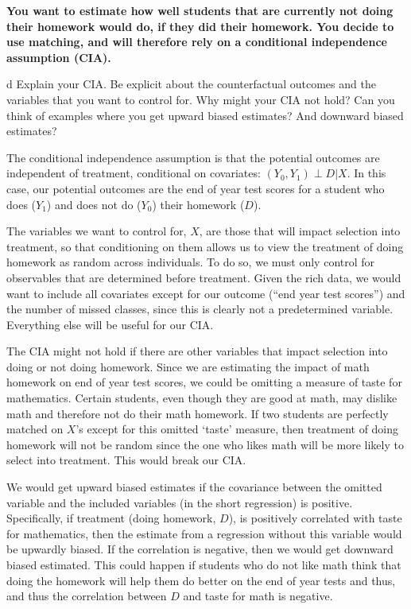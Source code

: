\documentclass{article}
\begin{document}
\textbf{You want to estimate how well students that are currently not doing their homework would do, if they did their homework. You decide to use matching, and will therefore rely on a conditional independence assumption (CIA).}
\begin{problem}{d}
Explain your CIA. Be explicit about the counterfactual outcomes and the variables that you want to control for. Why might your CIA not hold? Can you think of examples where you get upward biased estimates? And downward biased estimates?
\end{problem}
\begin{solution}
The conditional independence assumption is that the potential outcomes are independent of treatment, conditional on covariates: $(Y_0,Y_1)\perp D | X$. In this case, our potential outcomes are the end of year test scores for a student who does ($Y_1$) and does not do ($Y_0$) their homework ($D$). 

The variables we want to control for, $X$, are those that will impact selection into treatment, so that conditioning on them allows us to view the treatment of doing homework as random across individuals. To do so, we must only control for observables that are determined before treatment.  Given the rich data, we would want to include all covariates except for our outcome (``end year test scores'') and the number of missed classes, since this is clearly not a predetermined variable. Everything else will be useful for our CIA.
    
The CIA might not hold if there are other variables that impact selection into doing or not doing homework. Since we are estimating the impact of math homework on end of year test scores, we could be omitting a measure of taste for mathematics. Certain students, even though they are good at math, may dislike math and therefore not do their math homework. If two students are perfectly matched on $X$'s except for this omitted `taste' measure, then treatment of doing homework will not be random since the one who likes math will be more likely to select into treatment. This would break our CIA.

We would get upward biased estimates if the covariance between the omitted variable and the included variables (in the short regression) is positive. Specifically, if treatment (doing homework, $D$), is positively correlated with taste for mathematics, then the estimate from a regression without this variable would be upwardly biased. If the correlation is negative, then we would get downward biased estimated. This could happen if students who do not like math think that doing the homework will help them do better on the end of year tests and thus, and thus the correlation between $D$ and taste for math is negative.
\end{solution}
\end{document}
